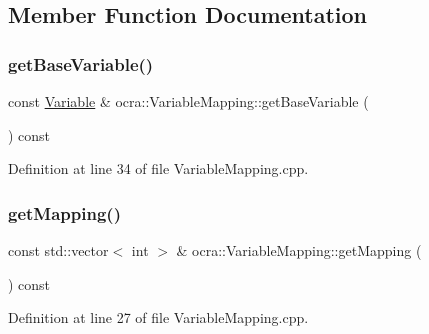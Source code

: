 \subsection{Member Function Documentation}
\hypertarget{classocra_1_1VariableMapping_ae4ab5717c945cb67425b542807d454ed}{}\label{classocra_1_1VariableMapping_ae4ab5717c945cb67425b542807d454ed} 
\subsubsection{\texorpdfstring{get\+Base\+Variable()}{getBaseVariable()}}
{\footnotesize\ttfamily const \hyperlink{classocra_1_1Variable}{Variable} \& ocra\+::\+Variable\+Mapping\+::get\+Base\+Variable (\begin{DoxyParamCaption}{ }\end{DoxyParamCaption}) const}



Definition at line 34 of file Variable\+Mapping.\+cpp.

\hypertarget{classocra_1_1VariableMapping_a79fc93dd267e09cb4cb07a2a34e4a4fa}{}\label{classocra_1_1VariableMapping_a79fc93dd267e09cb4cb07a2a34e4a4fa} 
\subsubsection{\texorpdfstring{get\+Mapping()}{getMapping()}}
{\footnotesize\ttfamily const std\+::vector$<$ int $>$ \& ocra\+::\+Variable\+Mapping\+::get\+Mapping (\begin{DoxyParamCaption}{ }\end{DoxyParamCaption}) const}



Definition at line 27 of file Variable\+Mapping.\+cpp.

\hypertarget{classocra_1_1VariableMapping_ab62611a9b9528ae74f9f259238f7a440}{}\label{classocra_1_1VariableMapping_ab62611a9b9528ae74f9f259238f7a440} 
